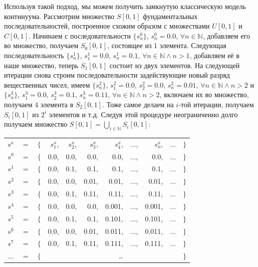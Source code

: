 \documentclass[12pt]{article}
\begin{document}
Используя такой подход, мы можем получить замкнутую классическую модель континуума. Рассмотрим множество $S[0, 1]$ фундаментальных последовательностей, построенное схожим образом с множествами $U[0, 1]$ и $C[0, 1]$. Начинаем с последовательности $\{s^0_n\}$, $s^0_n = 0.0$, $\forall n \in \mathbb{N}$, добавляем его во множество, получаем $S_0[0, 1]$, состоящее из 1 элемента. Следующая последовательность $\{s^1_n\}$, $s^1_1 = 0.0$, $s^1_n = 0.1$, $\forall n \in \mathbb{N} \wedge n > 1$, добавляем её в наше множество, теперь $S_1[0, 1]$ состоит из двух элементов. На следующей итерации снова строим последовательности задействующие новый разряд вещественных чисел, имеем $\{s^2_n\}$, $s^2_1 = 0.0$, $s^2_2 = 0.0$, $s^2_n = 0.01$, $\forall n \in \mathbb{N} \wedge n > 2$ и $\{s^3_n\}$, $s^3_1 = 0.0$, $s^3_2 = 0.1$, $s^3_n = 0.11$, $\forall n \in \mathbb{N} \wedge n > 2$, включаем их во множество, получаем 4 элемента в $S_2[0, 1]$. Тоже самое делаем на $i$-той итерации, получаем $S_i[0, 1]$ из $2^i$ элементов и т.д. Следуя этой процедуре неограниченно долго получаем множество $S[0, 1] = \bigcup\limits_{i \in \mathbb{N}} S_i[0, 1]$:
\begin{center}
\begin{tabular}{c c c r r r r r r r c} 
$s^x$ & $=$ & $\{$ & $s^x_1$, & $s^x_2$, & $s^x_3$, & $s^x_4$, & $\dots$, & $s^x_n$, & $\dots$ & $\}$\\
$s^0$ & $=$  & $\{$ & 0.0, & 0.0, & 0.0, & 0.0, & $\dots$, & 0.0, & $\dots$ & $\}$\\
$s^1$ & $=$  & $\{$ & 0.0, & 0.1, & 0.1, & 0.1, & $\dots$, & 0.1, & $\dots$ & $\}$\\
$s^2$ & $=$  & $\{$ & 0.0, & 0.0, & 0.01, & 0.01, & $\dots$, & 0.01, & $\dots$ & $\}$\\
$s^3$ & $=$  & $\{$ & 0.0, & 0.1, & 0.11, & 0.11, & $\dots$, & 0.11, & $\dots$ & $\}$\\
$s^4$ & $=$  & $\{$ & 0.0, & 0.0, & 0.0, & 0.001, & $\dots$, & 0.001, & $\dots$ & $\}$\\
$s^5$ & $=$  & $\{$ & 0.0, & 0.1, & 0.1, & 0.101, & $\dots$, & 0.101, & $\dots$ & $\}$\\
$s^6$ & $=$  & $\{$ & 0.0, & 0.0, & 0.01, & 0.011, & $\dots$, & 0.011, & $\dots$ & $\}$\\
$s^7$ & $=$  & $\{$ & 0.0, & 0.1, & 0.11, & 0.111, & $\dots$, & 0.111, & $\dots$ & $\}$\\
$\dots$ & $=$  & $\{$ &  &  &  & \dots &  &  &  & $\}$
\end{tabular}
\end{center}
\end{document}
